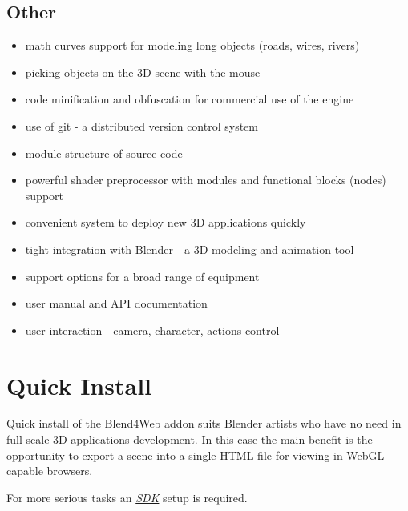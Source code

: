 \documentclass[a4paper,12pt,oneside]{sphinxmanual}
\begin{document}
\section{Other}
\label{features:id14}\begin{itemize}
\item {} 
math curves support for modeling long objects (roads, wires, rivers)

\item {} 
picking objects on the 3D scene with the mouse

\item {} 
code minification and obfuscation for commercial use of the engine

\item {} 
use of git - a distributed version control system

\item {} 
module structure of source code

\item {} 
powerful shader preprocessor with modules and functional blocks (nodes) support

\item {} 
convenient system to deploy new 3D applications quickly

\item {} 
tight integration with Blender - a 3D modeling and animation tool

\item {} 
support options for a broad range of equipment

\item {} 
user manual and API documentation

\item {} 
user interaction - camera, character, actions control

\end{itemize}


\chapter{Quick Install}
\label{first_steps:quick-install}\label{first_steps::doc}\label{first_steps:id1}
Quick install of the Blend4Web addon suits Blender artists who have no need in full-scale 3D applications development. In this case the main benefit is the opportunity to export a scene into a single HTML file for viewing in WebGL-capable browsers.

For more serious tasks an {\hyperref[setup:setup]{\emph{SDK}}} setup is required.
\end{document}
